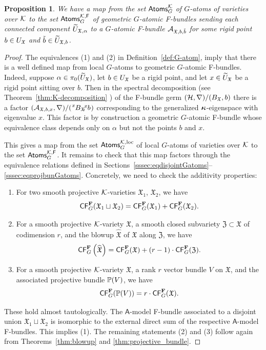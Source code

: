 \documentclass[twoside,leqno]{article}
\numberwithin{equation}{section}
\theoremstyle{plain}
\newtheorem{proposition}[equation]{Proposition}
\theoremstyle{definition}
\begin{document}
\begin{proposition} \label{prop:atoms_to_atomic_F-bundles}
  We have a map from the set $\mathsf{Atoms}_G^\mathcal K$ of $G$-atoms of varieties over $\mathcal K$ to the set $\mathsf{Atoms}_G^{\mathcal K,\mathsf F}$ of geometric $G$-atomic F-bundles sending each connected component $\widetilde U_{\mathfrak X,\alpha}$ to a $G$-atomic F-bundle $\mathcal A_{\mathfrak{X},b,\tilde b}$ for some rigid point $b\in U_\mathfrak X$ and $\tilde b\in\widetilde U_{\mathfrak X,b}$.
\end{proposition}
\begin{proof}
The equivalences (1) and (2) in Definition~\ref{def:G-atom}, imply that 
there is a well defined map from local $G$-atoms to geometric $G$-atomic F-bundles. Indeed, suppose  $\alpha \in \pi_{0}(\widetilde U_{\mathfrak X})$, let $b \in U_{\mathfrak X}$ be a rigid point, and let $x \in \widetilde U_{\mathfrak X}$ be a rigid point sitting over $b$. Then in the spectral decomposition (see Theorem~\ref{thm:K-decomposition} ) of the F-bundle germ  $(\mathcal H,\nabla)/(B_{\mathfrak X},b)$ there is a factor $(\cA_{\fX,b,x},\nabla)/(\tensor[^x]{{B_{\fX}}}{}\!\!,\!\!\tensor[^x]{b}{})$ corresponding to the generalized $\boldsymbol{\kappa}$-eigenspace with eigenvalue $x$. This factor is by construction a geometric $G$-atomic 
F-bundle whose equivalence class depends only on $\alpha$ but not the points $b$ and $x$.

This gives a map from the set $\mathsf{Atoms}_G^{\mathcal K,\mathrm{loc}}$ of local $G$-atoms of varieties over $\mathcal K$ to the set $\mathsf{Atoms}_G^{\mathcal K,\mathsf F}$. It remains to check that this map factors through the equivalence relations defined in Sections~\ref{sssec:eqdisjointGatoms}--\ref{sssec:eqprojbunGatoms}.
Concretely, we need to check the additivity properties:
  \begin{enumerate}[wide]
    \item For two smooth projective $\mathcal K$-varieties $\mathfrak{X}_1$, $\mathfrak{X}_2$, we have
    \[ \mathsf{CF}_{G}^{\mathbf{F}}(\mathfrak{X}_1 \sqcup \mathfrak{X}_2) = \mathsf{CF}_{G}^{\mathbf{F}}(\mathfrak{X}_1) + \mathsf{CF}_{G}^{\mathbf{F}}(\mathfrak{X}_2). \]
    \item For a smooth projective $\mathcal K$-variety $\mathfrak{X}$, a smooth closed subvariety $\mathfrak{Z} \subset \mathfrak{X}$ of codimension $r$, and the blowup $\widehat{\mathfrak{X}}$ of $\mathfrak{X}$ along $\mathfrak{Z}$, we have
    \[ \mathsf{CF}_{G}^{\mathbf{F}}\left(\widehat{\mathfrak{X}}\right) = \mathsf{CF}_{G}^{\mathbf{F}}(\mathfrak{X}) + (r-1)\cdot \mathsf{CF}_{G}^{\mathbf{F}}(\mathfrak{Z}). \]
    \item For a smooth projective $\mathcal K$-variety $\mathfrak{X}$, a rank $r$ vector bundle $V$ on $\mathfrak{X}$, and the associated projective bundle $\mathbb P(V)$, we have
    \[ \mathsf{CF}_{G}^{\mathbf{F}}(\mathbb P(V)) = r \cdot \mathsf{CF}_{G}^{\mathbf{F}}(\mathfrak{X}) .\]
  \end{enumerate}
  These hold almost tautologically. The $\mathsf{A}$-model F-bundle associated to a disjoint union $\mathfrak{X}_1 \sqcup \mathfrak{X}_2$ is isomorphic to the external direct sum of the respective $\mathsf{A}$-model F-bundles.
  This implies (1).
  The remaining statements (2) and (3)  follow again from Theorems~\ref{thm:blowup} and \ref{thm:projective_bundle}.
\end{proof}
\end{document}
